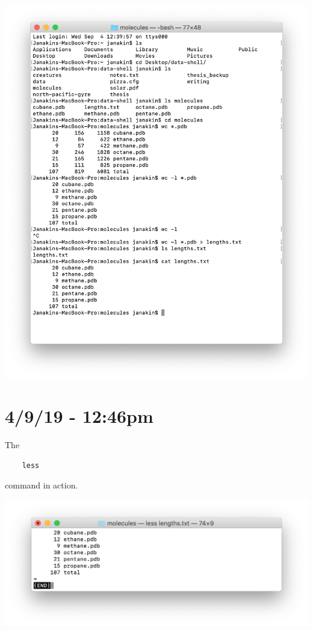 \documentclass{article}
\begin{document}
\includegraphics[width=\textwidth]{figc.png}

\section*{4/9/19 - 12:46pm}

The \begin{verbatim}
    less
\end{verbatim}
command in action.

\includegraphics[width=\textwidth]{figd.png}
\end{document}
